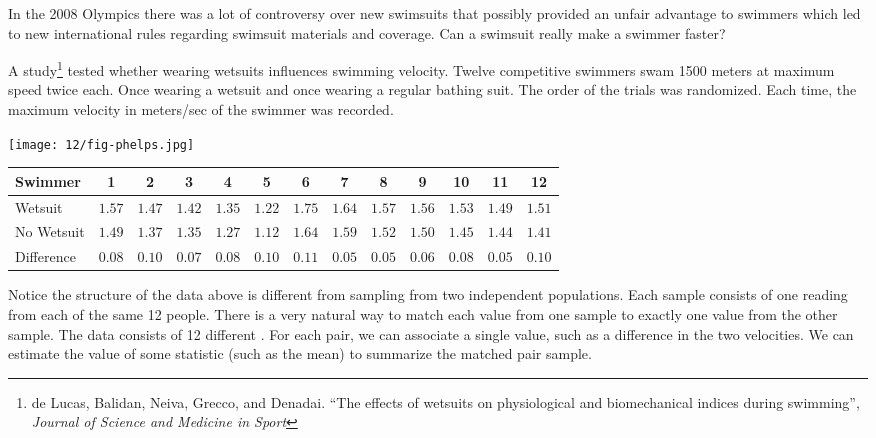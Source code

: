 \begin{multicols}{2}

In the 2008 Olympics there was a lot of controversy over new swimsuits that possibly provided an unfair advantage to swimmers which led to new international rules regarding swimsuit materials and coverage. Can a swimsuit really make a swimmer faster?

\bigskip

A study\footnote{de Lucas, Balidan, Neiva, Grecco, and Denadai. ``The effects of wetsuits on physiological and biomechanical indices during swimming'', \textit{Journal of Science and Medicine in Sport}} tested whether wearing wetsuits influences swimming velocity. Twelve competitive swimmers swam 1500 meters at maximum speed twice each. Once wearing a wetsuit and once wearing a regular bathing suit. The order of the trials was randomized. Each time, the maximum velocity in meters/sec of the swimmer was recorded.

\columnbreak

\texttt{[image: 12/fig-phelps.jpg]}

\end{multicols}

\vspace{0.5in}

\begin{tabular}{|l||c|c|c|c|c|c|c|c|c|c|c|c|}
Swimmer & 1 & 2 & 3 & 4 & 5 & 6 & 7 & 8 & 9 & 10 & 11 & 12 \\
\hline
Wetsuit & $1.57$ & $1.47$ & $1.42$ & $1.35$ & $1.22$ & $1.75$ & $1.64$ & $1.57$ & $1.56$ & $1.53$ & $1.49$ & $1.51$ \\
No Wetsuit & $1.49$ & $1.37$ & $1.35$ & $1.27$ & $1.12$ & $1.64$ & $1.59$ & $1.52$ & $1.50$ & $1.45$ & $1.44$ & $1.41$ \\
\hline
Difference & $0.08$ &  $0.10$ &  $0.07$ &  $0.08$ &  $0.10$ & $0.11$ & $0.05$ & $0.05$ & $0.06$ & $0.08$ & $0.05$ &  $0.10$
\end{tabular}

\vspace{0.5in}

\bbox
Notice the structure of the data above is different from sampling from two independent populations.
\bi
\ii Each sample consists of one reading from each of the same 12 people.
\ii There is a very natural way to match each value from one sample to exactly one value from the other sample.
\ii The data consists of 12 different \textbf{}.
\ii For each pair, we can associate a single value, such as a difference in the two velocities.
\ii We can estimate the value of some statistic (such as the mean) to summarize the matched pair sample.
\ei
\ebox

